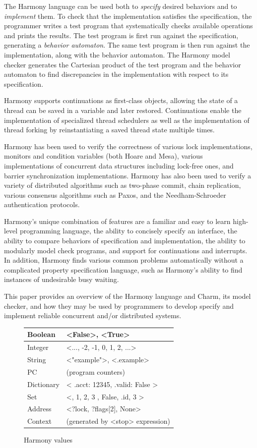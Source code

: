\documentclass[twocolumn]{article}
\begin{document}
The Harmony language can be used both to \emph{specify} desired
behaviors and to \emph{implement} them.  To check that the implementation
satisfies the specification, the programmer writes a test program that
systematically checks available operations and prints the results.
The test program is first run against the specification, generating
a \emph{behavior automaton}.  The same test program is then run
against the implementation, along with the behavior automaton.
The Harmony model checker generates the Cartesian product of the test program
and the behavior automaton to find discrepancies in the implementation
with respect to its specification.

Harmony supports continuations as first-class objects, allowing the
state of a thread can be saved in a variable and later restored.
Continuations enable the implementation of specialized thread
schedulers as well as the implementation of thread forking by
reinstantiating a saved thread state multiple times.

Harmony has been used to verify the correctness of various lock
implementations, monitors and condition variables (both Hoare and Mesa),
various implementations of concurrent data structures including lock-free
ones, and barrier synchronization implementations.  Harmony has also been
used to verify a variety of distributed algorithms such as two-phase
commit, chain replication, various consensus algorithms such as Paxos,
and the Needham-Schroeder authentication protocols.

Harmony's unique combination of features are a familiar and easy
to learn high-level programming language, the ability to concisely
specify an interface, the ability to compare behaviors of specification
and implementation, the ability to modularly model check programs,
and support for continuations and interrupts.  In addition, Harmony
finds various common problems automatically without a complicated
property specification language, such as Harmony's ability to find
instances of undesirable busy waiting.

This paper provides an overview of the Harmony language and Charm,
its model checker, and how they may be used by programmers to
develop specify and implement reliable concurrent and/or
distributed systems.

\begin{figure}
\begin{tabular}{|l|l|}
\hline
Boolean & <{False}>, <{True}> \\
\hline
Integer & <{..., -2, -1, 0, 1, 2, ...}> \\
\hline
String & <{"example"}>, <{.example}> \\
\hline
PC & (program counters) \\
\hline
Dictionary & <{{ .acct: 12345, .valid: False }}> \\
\hline
Set & <{{}, { 1, 2, 3 }, { False, .id, 3 }}> \\
\hline
Address & <{?lock, ?flags[2], None}> \\
\hline
Context & (generated by <{stop}> expression) \\
\hline
\end{tabular}
\caption{Harmony values}
\label{fig:values}
\end{figure}
\end{document}
